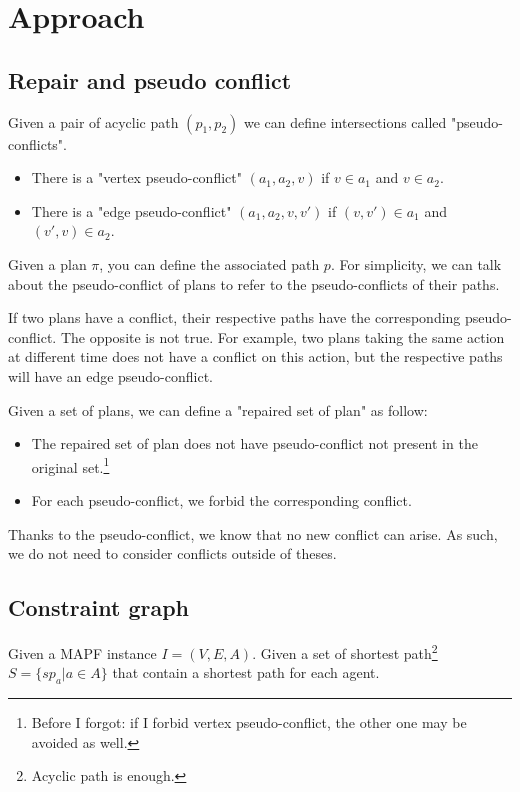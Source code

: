 \section{Approach}\label{sec:approach}

\subsection{Repair and pseudo conflict}
Given a pair of acyclic path $(p_1,p_2)$ we can define intersections called "pseudo-conflicts".

\begin{itemize}
  \item There is a "vertex pseudo-conflict" $(a_1,a_2,v)$ if $v \in a_1$ and $v \in a_2$.
  \item There is a "edge pseudo-conflict" $(a_1,a_2,v,v')$ if $(v,v') \in a_1$ and $(v',v) \in a_2$.
\end{itemize}

Given a plan $\pi$, you can define the associated path $p$. For simplicity, we can talk about the pseudo-conflict of plans to refer to the pseudo-conflicts of their paths.

If two plans have a conflict, their respective paths have the corresponding pseudo-conflict. The opposite is not true. For example, two plans taking the same action at different time does not have a conflict on this action, but the respective paths will have an edge pseudo-conflict.

Given a set of plans, we can define a "repaired set of plan" as follow:
\begin{itemize}
  \item The repaired set of plan does not have pseudo-conflict not present in the original set.\footnote{Before I forgot: if I forbid vertex pseudo-conflict, the other one may be avoided as well.}
  \item For each pseudo-conflict, we forbid the corresponding conflict.
\end{itemize}
Thanks to the pseudo-conflict, we know that no new conflict can arise. As such, we do not need to consider conflicts outside of theses.

\subsection{Constraint graph}
Given a MAPF instance $I=(V,E,A)$.
Given a set of shortest path\footnote{Acyclic path is enough.} $S = \{sp_a | a \in A \}$ that contain a shortest path for each agent.

